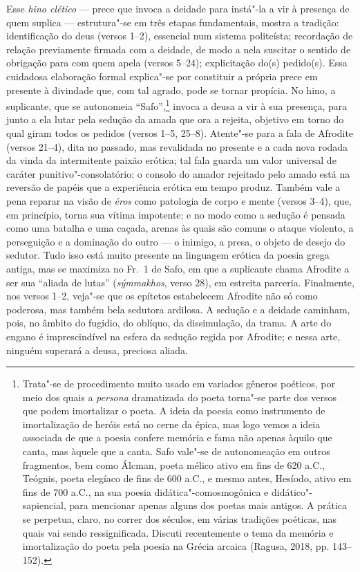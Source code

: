 {\small Esse \textit{hino clético} --- prece que invoca a deidade para instá"-la a vir à
presença de quem suplica --- estrutura"-se em três etapas
fundamentais, mostra a tradição: identificação do deus (versos 1--2), essencial
num sistema politeísta; recordação de relação previamente firmada com a
deidade, de modo a nela suscitar o sentido de obrigação para com quem apela
(versos 5--24); explicitação do(s) pedido(s). Essa cuidadosa elaboração
formal explica"-se por constituir a própria prece em presente à divindade que, com
tal agrado, pode se tornar propícia. No hino, a suplicante, que se autonomeia
“Safo”,\footnote{Trata"-se de procedimento muito usado em variados gêneros poéticos, por meio dos quais a \textit{persona} dramatizada do poeta torna"-se parte dos versos que podem imortalizar o poeta. A ideia da poesia como instrumento de imortalização de heróis está no cerne da épica, mas logo vemos a ideia associada de que a poesia confere memória e fama não apenas àquilo que canta, mas àquele que a canta. Safo vale"-se de autonomeação em outros fragmentos, bem como Álcman, poeta mélico ativo em fins de 620 a.C., Teógnis, poeta elegíaco de fins de 600 a.C., e mesmo antes, Hesíodo, ativo em fins de 700 a.C., na sua poesia didática"-comosmogônica e didático"-sapiencial, para mencionar apenas alguns dos poetas mais antigos. A prática se perpetua, claro, no correr dos séculos, em várias tradições poéticas, nas quais vai sendo ressignificada. Discuti recentemente o tema da memória e imortalização do poeta pela poesia na Grécia arcaica (Ragusa, 2018, pp. 143--152).} invoca a deusa
a vir à sua presença, para junto a ela lutar pela sedução da amada que ora a
rejeita, objetivo em torno do qual giram todos os pedidos (versos 1--5, 25--8).
Atente"-se para a fala de Afrodite (versos 21--4), dita no passado, mas
revalidada no presente e a cada nova rodada da vinda da intermitente paixão
erótica; tal fala guarda um valor universal de caráter punitivo"-consolatório: o
consolo do amador rejeitado pelo amado está na reversão de papéis que a
experiência erótica em tempo produz. Também vale a pena reparar na visão de
\textit{éros} como patologia de corpo e mente (versos 3--4), que, em princípio,
torna sua vítima impotente; e no modo como a sedução é pensada como uma batalha
e uma caçada, arenas às quais são comuns o ataque violento, a perseguição e a
dominação do outro --- o inimigo, a presa, o objeto de desejo do sedutor. Tudo
isso está muito presente na linguagem erótica da poesia grega antiga, mas se
maximiza no Fr.~1 de Safo, em que a suplicante chama Afrodite a ser sua
“aliada de lutas” (\textit{sýmmakhos}, verso 28), em estreita parceria. Finalmente, nos versos 1--2, veja"-se
que os epítetos estabelecem Afrodite não só como poderosa, mas também bela
sedutora ardilosa. A sedução e a deidade caminham, pois, no âmbito do fugidio,
do oblíquo, da dissimulação, da trama. A arte do engano é imprescindível na
esfera da sedução regida por Afrodite; e nessa arte, ninguém superará a deusa,
preciosa aliada.

}
